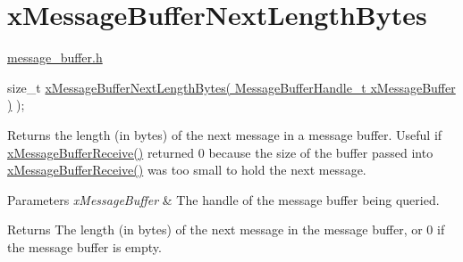 \hypertarget{group__x_message_buffer_next_length_bytes}{}\section{x\+Message\+Buffer\+Next\+Length\+Bytes}
\label{group__x_message_buffer_next_length_bytes}
\hyperlink{message__buffer_8h}{message\+\_\+buffer.\+h} 
\begin{DoxyPre}
size\_t \hyperlink{message__buffer_8h_ae2b56b6564cf2476891394231a31ecad}{xMessageBufferNextLengthBytes( MessageBufferHandle\_t xMessageBuffer )} );
\end{DoxyPre}
 Returns the length (in bytes) of the next message in a message buffer. Useful if \hyperlink{message__buffer_8h_af12a227ba511a95cbea5aa81c7f3ba12}{x\+Message\+Buffer\+Receive()} returned 0 because the size of the buffer passed into \hyperlink{message__buffer_8h_af12a227ba511a95cbea5aa81c7f3ba12}{x\+Message\+Buffer\+Receive()} was too small to hold the next message.


\begin{DoxyParams}{Parameters}
{\em x\+Message\+Buffer} & The handle of the message buffer being queried.\\
\hline
\end{DoxyParams}
\begin{DoxyReturn}{Returns}
The length (in bytes) of the next message in the message buffer, or 0 if the message buffer is empty. 
\end{DoxyReturn}
